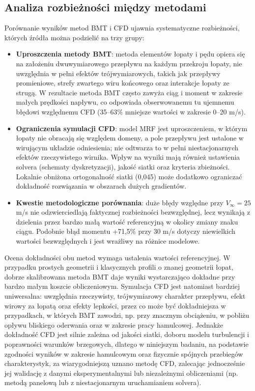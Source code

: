 \documentclass[12pt,a4paper,twoside]{article}
\begin{document}
	\subsection{Analiza rozbieżności między metodami}
	Porównanie wyników metod BMT i CFD ujawnia systematyczne rozbieżności, których źródła można podzielić na trzy grupy:
	\begin{itemize}
		\item \textbf{Uproszczenia metody BMT}: metoda elementów łopaty i pędu opiera się na założeniu dwuwymiarowego przepływu na każdym przekroju łopaty, nie uwzględnia w pełni efektów trójwymiarowych, takich jak przepływy promieniowe, strefy zwartego wiru końcowego oraz interakcje łopaty ze strugą. W rezultacie metoda BMT często zawyża ciąg i moment w zakresie małych prędkości napływu, co odpowiada obserwowanemu tu ujemnemu błędowi względnemu CFD (35--63\% mniejsze wartości w zakresie 0--20 m/s).
		\item \textbf{Ograniczenia symulacji CFD}: model MRF jest uproszczeniem, w którym łopaty nie obracają się względem domeny, a pole przepływu jest ustalone w wirującym układzie odniesienia; nie odtwarza to w pełni niestacjonarnych efektów rzeczywistego wirnika. Wpływ na wyniki mają również ustawienia solvera (schematy dyskretyzacji), jakość siatki oraz kryteria zbieżności. Lokalnie obniżona ortogonalność siatki (0,045) może dodatkowo ograniczać dokładność rozwiązania w obszarach dużych gradientów.
		\item \textbf{Kwestie metodologiczne porównania}: duże błędy względne przy \(V_\infty = 25\) m/s nie odzwierciedlają faktycznej rozbieżności bezwzględnej, lecz wynikają z dzielenia przez bardzo małą wartość referencyjną w okolicy zmiany znaku ciągu. Podobnie błąd momentu +71,5\% przy 30 m/s dotyczy niewielkich wartości bezwzględnych i jest wrażliwy na różnice modelowe.
	\end{itemize}
	Ocena dokładności obu metod wymaga ustalenia wartości referencyjnej. W przypadku prostych geometrii i klasycznych profili o znanej geometrii łopat, dobrze skalibrowana metoda BMT daje wyniki wystarczająco dokładne przy bardzo małym koszcie obliczeniowym. Symulacja CFD jest natomiast bardziej uniwersalna: uwzględnia rzeczywisty, trójwymiarowy charakter przepływu, efekt wirowy za łopatą oraz efekty lepkości, przez co może być dokładniejsza w przypadkach, w których BMT zawodzi, np. przy znacznym obciążeniu, w pobliżu opływu bliskiego oderwania oraz w zakresie pracy hamulcowej. Jednakże dokładność CFD jest silnie zależna od jakości siatki, doboru modelu turbulencji i poprawności warunków brzegowych, dlatego w niniejszym badaniu, na podstawie zgodności wyników w zakresie hamulcowym oraz fizycznie spójnych przebiegów charakterystyk, za wiarygodniejszą uznano metodę CFD, zalecając jednocześnie jej walidację z danymi eksperymentalnymi lub niezależnymi obliczeniami (np. metodą panelową lub z niestacjonarnym uruchamianiem solvera).
	
\end{document}
